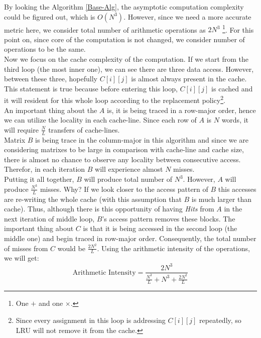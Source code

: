 \documentclass[paper=a4, fontsize=11pt]{scrartcl} %
\numberwithin{equation}{section} %
\numberwithin{figure}{section} %
\numberwithin{table}{section} %
\begin{document}
By looking the Algorithm \ref{Base-Alg}, the asymptotic computation complexity could be figured out, which is $O(N^{3})$. However, since we need a more accurate metric here, we consider total number of arithmetic operations as $2N^{3}$  \footnote{ One $+$ and one $\times$.}. For this point on, since core of the computation is not changed, we consider number of operations to be the same.\\
Now we focus on the cache complexity of the computation. If we start from the third loop (the most inner one), we can see there are three data access. However, between these three, hopefully $C[ i ][ j ]$ is almost always present in the cache. This statement is true because before entering this loop, $C[ i ][ j ]$ is cached and it will resident for this whole loop according to the replacement policy\footnote{Since every assignment in this loop is addressing $C[ i ][ j ]$ repeatedly, so LRU will not remove it from the cache.}.\\
An important thing about the $A$ is, it is being traced in a row-major order, hence we can utilize the locality in each cache-line. Since each row of $A$ is $N$ words, it will require $\frac{N}{L}$ transfers of cache-lines.\\
Matrix $B$ is being trace in the column-major in this algorithm and since we are considering matrixes to be large in comparison with cache-line and cache size, there is almost no chance to observe any locality between consecutive access. Therefor, in each iteration $B$ will experience almost $N$ misses.\\
Putting it all together, $B$ will produce total number of $N^{3}$. However, $A$ will produce $\frac{N^{3}}{L}$ misses. Why? If we look closer to the access pattern of $B$ this accesses are re-writing the whole cache (with this assumption that $B$ is much larger than cache). Thus, although there is this opportunity of having \textit{Hits} from $A$ in the next iteration of middle loop, $B$'s access pattern removes these blocks. The important thing about $C$ is that it is being accessed in the second loop (the middle one) and begin traced in row-major order. Consequently, the total number of misses from $C$ would be $\frac{2N^{2}}{L}$. Using the arithmetic intensity of the operations, we will get:
\begin{equation*}
\text{Arithmetic Intensity} = \frac{2N^{3}}{ \frac{N^{3}}{L} + {N^{3}} + \frac{2N^{2}}{L} }
\end{equation*}
\end{document}
